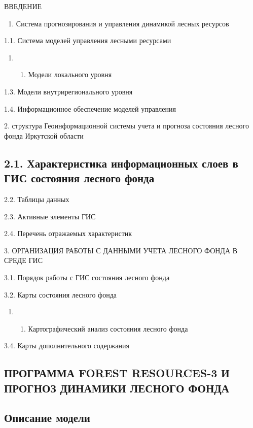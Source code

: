 \documentclass{report}
\begin{document}
ВВЕДЕНИЕ

\begin{enumerate}
\item Система прогнозирования и управления динамикой лесных ресурсов
\end{enumerate}
1.1.  Система моделей управления лесными ресурсами

\begin{enumerate}
\item \begin{enumerate}
\item  Модели локального уровня
\end{enumerate}
\end{enumerate}
1.3.  Модели внутрирегионального уровня

1.4.  Информационное обеспечение моделей управления

2. структура Геоинформационной системы учета и прогноза состояния лесного фонда Иркутской области

\subsection[2.1. \ Характеристика информационных слоев в ГИС состояния \ лесного фонда]{2.1.  Характеристика
информационных слоев в ГИС состояния  лесного фонда}
2.2.  Таблицы данных 

2.3.  Активные элементы ГИС 

2.4.  Перечень отражаемых характеристик

3. ОРГАНИЗАЦИЯ РАБОТЫ С ДАННЫМИ УЧЕТА ЛЕСНОГО ФОНДА В СРЕДЕ ГИС

3.1.  Порядок работы с ГИС состояния лесного фонда

3.2.  Карты состояния лесного фонда

\begin{enumerate}
\item \begin{enumerate}
\item  Картографический анализ состояния лесного фонда 
\end{enumerate}
\end{enumerate}
3.4.  Карты дополнительного содержания 

\subsection[ПРОГРАММА FOREST RESOURCES{}-3 И ПРОГНОЗ ДИНАМИКИ ЛЕСНОГО ФОНДА]{ПРОГРАММА FOREST RESOURCES{}-3 И ПРОГНОЗ
ДИНАМИКИ ЛЕСНОГО ФОНДА}
\subsection[\ Описание модели ]{ Описание модели }
\end{document}
